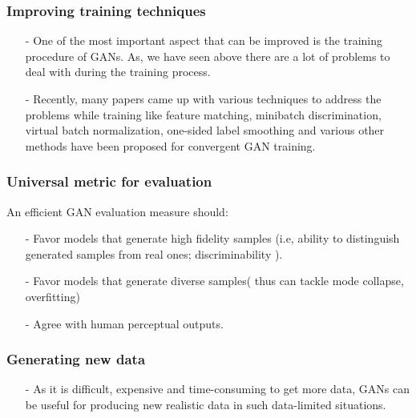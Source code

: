\documentclass [11pt]{article}
\begin{document}
\subsubsection{Improving training techniques}
\begin{itemize}
    \item[-] One of the most important aspect that can be improved is the training procedure of GANs. As, we have seen above there are a lot of problems to deal with during the training process.
    
    \item[-] Recently, many papers came up with various techniques to address the problems while training like feature matching, minibatch discrimination, virtual batch normalization, one-sided label smoothing and various other methods have been proposed 
    for convergent GAN training.
    
\end{itemize}

\subsubsection{Universal metric for evaluation}
An efficient GAN evaluation measure should:
\begin{itemize}
    \item[-] Favor models that generate high fidelity samples (i.e, ability to distinguish
generated samples from real ones; discriminability ).
    \item[-] Favor models that generate diverse samples( thus can tackle mode collapse, overfitting)
    \item[-] Agree with human perceptual outputs.
\end{itemize}

\subsubsection{Generating new data}
\begin{itemize}
    \item[-] As it is difficult, expensive and time-consuming to get more data, GANs can be useful for producing new realistic data in such data-limited situations.
\end{itemize}




\vspace{0.5cm}

\nocite{*}


\end{document}

